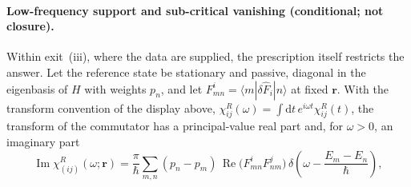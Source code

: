 \paragraph{Low-frequency support and sub-critical vanishing (conditional; not closure).} Within exit~(iii), where the data are supplied, the prescription itself restricts the answer. Let the reference state be stationary and passive, diagonal in the eigenbasis of \(H\) with weights \(p_n\), and let \(F^i_{mn}=\langle m|\delta\hat F_i|n\rangle\) at fixed \(\mathbf r\). With the transform convention of the display above, \(\chi^R_{ij}(\omega)=\int\mathrm dt\,e^{i\omega t}\chi^R_{ij}(t)\), the transform of the commutator has a principal-value real part and, for \(\omega>0\), an imaginary part
\[
\operatorname{Im}\chi^R_{(ij)}(\omega;\mathbf r)
=
\frac{\pi}{\hbar}
\sum_{m,n}
(p_n-p_m)\,
\operatorname{Re}\!\bigl(F^i_{mn}F^j_{nm}\bigr)\,
\delta\!\left(\omega-\frac{E_m-E_n}{\hbar}\right),
\]
